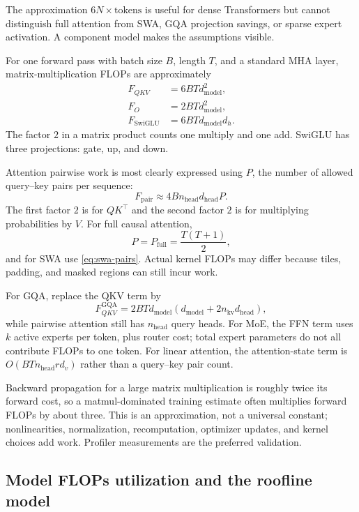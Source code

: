 \documentclass[11pt,a4paper]{article}
\theoremstyle{definition}
\theoremstyle{plain}
\newcommand{\dmodel}{d_{\mathrm{model}}}
\newcommand{\dhead}{d_{\mathrm{head}}}
\newcommand{\nhead}{n_{\mathrm{head}}}
\begin{document}
The approximation $6N\times\text{tokens}$ is useful for dense Transformers but cannot distinguish full attention from SWA, GQA projection savings, or sparse expert activation. A component model makes the assumptions visible.

For one forward pass with batch size $B$, length $T$, and a standard MHA layer, matrix-multiplication FLOPs are approximately
\begin{align}
    F_{QKV}&=6BT\dmodel^2,\\
    F_O&=2BT\dmodel^2,\\
    F_{\mathrm{SwiGLU}}&=6BT\dmodel d_h.
\end{align}
The factor $2$ in a matrix product counts one multiply and one add. SwiGLU has three projections: gate, up, and down.

Attention pairwise work is most clearly expressed using $P$, the number of allowed query--key pairs per sequence:
\begin{equation}\label{eq:attention-flops-pairs}
    F_{\mathrm{pair}}
    \approx4B\nhead\dhead P.
\end{equation}
The first factor $2$ is for $QK^\top$ and the second factor $2$ is for multiplying probabilities by $V$. For full causal attention,
\begin{equation}
    P=P_{\mathrm{full}}=\frac{T(T+1)}{2},
\end{equation}
and for SWA use \cref{eq:swa-pairs}. Actual kernel FLOPs may differ because tiles, padding, and masked regions can still incur work.

For GQA, replace the QKV term by
\begin{equation}
    F_{QKV}^{\mathrm{GQA}}
    =2BT\dmodel(\dmodel+2n_{\mathrm{kv}}\dhead),
\end{equation}
while pairwise attention still has $\nhead$ query heads. For MoE, the FFN term uses $k$ active experts per token, plus router cost; total expert parameters do not all contribute FLOPs to one token. For linear attention, the attention-state term is $O(BT\nhead r d_v)$ rather than a query--key pair count.

Backward propagation for a large matrix multiplication is roughly twice its forward cost, so a matmul-dominated training estimate often multiplies forward FLOPs by about three. This is an approximation, not a universal constant; nonlinearities, normalization, recomputation, optimizer updates, and kernel choices add work. Profiler measurements are the preferred validation.

\subsection{Model FLOPs utilization and the roofline model}
\label{sec:roofline}
\end{document}
